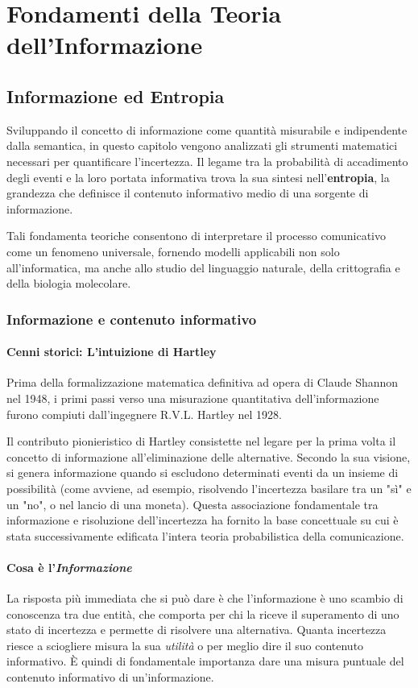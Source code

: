 \part{Fondamenti della Teoria dell'Informazione}

\chapter{Informazione ed Entropia}

Sviluppando il concetto di informazione come quantità misurabile e indipendente dalla semantica, in questo capitolo vengono analizzati gli strumenti matematici necessari per quantificare l'incertezza. Il legame tra la probabilità di accadimento degli eventi e la loro portata informativa trova la sua sintesi nell'\textbf{entropia}, la grandezza che definisce il contenuto informativo medio di una sorgente di informazione.

Tali fondamenta teoriche consentono di interpretare il processo comunicativo come un fenomeno universale, fornendo modelli applicabili non solo all'informatica, ma anche allo studio del linguaggio naturale, della crittografia e della biologia molecolare.

\section{Informazione e contenuto informativo}

\subsection{Cenni storici: L'intuizione di Hartley}
Prima della formalizzazione matematica definitiva ad opera di Claude Shannon nel 1948, i primi passi verso una misurazione quantitativa dell'informazione furono compiuti dall'ingegnere R.V.L. Hartley nel 1928. 

Il contributo pionieristico di Hartley consistette nel legare per la prima volta il concetto di informazione all'eliminazione delle alternative. Secondo la sua visione, si genera informazione quando si escludono determinati eventi da un insieme di possibilità (come avviene, ad esempio, risolvendo l'incertezza basilare tra un "sì" e un "no", o nel lancio di una moneta). Questa associazione fondamentale tra informazione e risoluzione dell'incertezza ha fornito la base concettuale su cui è stata successivamente edificata l'intera teoria probabilistica della comunicazione.

\subsection{Cosa è l'\textit{Informazione}}
La risposta più immediata che si può dare è che l'informazione è uno scambio di conoscenza tra due entità, che comporta per chi la riceve il superamento di uno stato di incertezza e permette di risolvere una alternativa. Quanta incertezza riesce a sciogliere misura la sua \textit{utilità} o per meglio dire il suo contenuto informativo.
È quindi di fondamentale importanza dare una misura puntuale del contenuto informativo di un'informazione.


